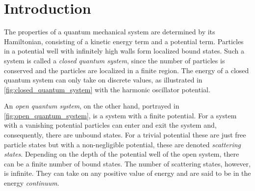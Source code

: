 \documentclass[../main/report.tex]{subfiles}
\begin{document}
\chapter{Introduction}
\label{cha:introduction}






The properties of a quantum mechanical system are determined by its Hamiltonian, consisting of a kinetic energy term and a potential term.
Particles in a potential well with infinitely high walls form localized bound states.
Such a system is called a \emph{closed quantum system}, since the number of particles is conserved and the particles are localized in a finite region. 
The energy of a closed quantum system can only take on discrete values, as illustrated in \cref{fig:closed_quantum_system} with the harmonic oscillator potential.

An \emph{open quantum system}, on the other hand, portrayed in \cref{fig:open_quantum_system}, is a system with a finite potential.
For a system with a vanishing potential particles can enter and exit the system and, consequently, there are unbound states. 
For a trivial potential these are just free particle states but with a non-negligible potential, these are denoted \emph{scattering states}.
Depending on the depth of the potential well of the open system, there can be a finite number of bound states.
The number of scattering states, however, is infinite. They can take on any positive value of energy and are said to be in the energy \emph{continuum}.
\end{document}
